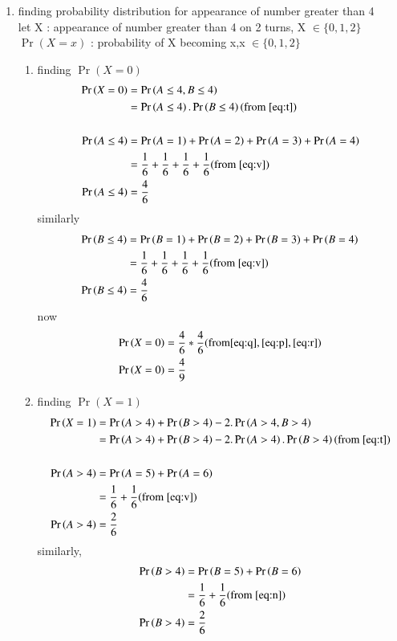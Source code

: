 \documentclass[journal,12pt,onecolumn]{IEEEtran}
\providecommand{\pr}[1]{\ensuremath{\Pr\left(#1\right)}}
\theoremstyle{remark}
\begin{document}
\begin{enumerate}
\item finding probability distribution for appearance of number greater than 4\\
let X : appearance of number greater than 4 on 2 turns,
X $\in \{ 0,1,2 \}$ \\
$\pr{X=x}$ : probability of X becoming x,x $\in \{ 0,1,2 \}$
\begin{enumerate}
\item finding $\pr{X=0}$
\begin{align}
\pr{X=0}&=\pr{A\leq4,B\leq4}\\
&=\pr{A\leq4}.\pr{B\leq4} \label{eq:q}     (\text{from } \eqref{eq:t}) \\\\
\pr{A\leq4}
&=\pr{A=1}+\pr{A=2}+\pr{A=3}+\pr{A=4} \\
&=\frac{1}{6}+\frac{1}{6}+\frac{1}{6}+\frac{1}{6} (\text{from } \eqref{eq:v})\\
\pr{A\leq4}&=\frac{4}{6}\label{eq:r}
\end{align}
similarly
\begin{align}
\pr{B\leq4}
&=\pr{B=1}+\pr{B=2}+\pr{B=3}+\pr{B=4}\\
&=\frac{1}{6}+\frac{1}{6}+\frac{1}{6}+\frac{1}{6} (\text{from } \eqref{eq:v})\\
\pr{B\leq4}&=\frac{4}{6} \label{eq:p}
\end{align}
now
\begin{align}
\pr{X=0}&=\frac{4}{6}*\frac{4}{6} (\text{from} \eqref{eq:q},\eqref{eq:p},\eqref{eq:r})\\
\pr{X=0}&=\frac{4}{9}
\end{align}
\item finding $\pr{X=1}$
\begin{align}
\pr{X=1}&=\pr{A>4}+\pr{B>4}-2.\pr{A>4,B>4}\\
&=\pr{A>4}+\pr{B>4}-2.\pr{A>4}.\pr{B>4}  (\text{from } \eqref{eq:t})\\\\
\pr{A>4}&=\pr{A=5}+\pr{A=6}\\
&=\frac{1}{6}+\frac{1}{6} (\text{from } \eqref{eq:v})\\
\pr{A>4}&=\frac{2}{6} \label{eq:e}
\end{align}
similarly,
\begin{align}
\pr{B>4}&=\pr{B=5}+\pr{B=6}\\
&=\frac{1}{6}+\frac{1}{6} (\text{from } \eqref{eq:n})\\
\pr{B>4}&=\frac{2}{6} \label{eq:y}

\end{align}
\end{enumerate}
\end{enumerate}
\end{document}
